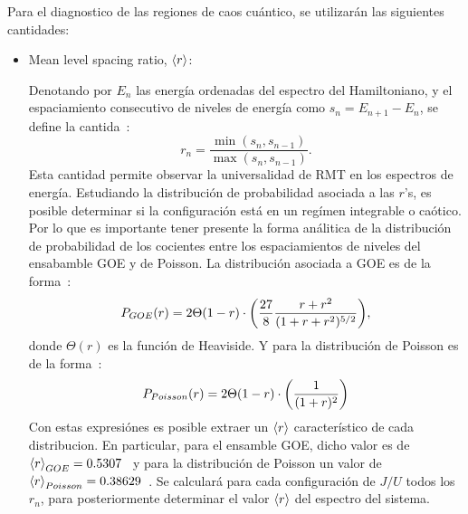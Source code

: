 \documentclass[spanish,titlepage,table]{practicas}
\begin{document}
Para el diagnostico de las regiones de caos cuántico, se utilizarán las siguientes cantidades:
\begin{itemize}
    \item Mean level spacing ratio, $\ev{r}$:

Denotando por $E_n$ las energía ordenadas del espectro del Hamiltoniano, y el espaciamiento consecutivo de niveles de energía como 
$s_n=E_{n+1}-E_{n}$, se define la cantida~\cite{Atas_2013}:
\begin{equation}
	r_n=\frac{\min(s_n,s_{n-1})}{\max(s_n,s_{n-1})}.
\end{equation}
Esta cantidad permite observar la universalidad de RMT en los espectros de energía.
Estudiando la distribución de probabilidad asociada a las $r$'s, es posible determinar si la configuración está en un regímen integrable 
o caótico. Por lo que es importante tener presente la forma análitica de la distribución de probabilidad de los cocientes entre 
los espaciamientos de niveles del ensabamble GOE y de Poisson.
La distribución asociada a GOE es de la forma~\cite{Atas_2013}:
\begin{equation}
 P_{GOE}(r)=2\Theta(1-r)\cdot \qty(\frac{27}{8}\frac{r+r^{2}}{(1+r+r^{2})^{5/2}}),
\end{equation}
donde $\Theta(r)$ es la función de Heaviside.
Y para la distribución de Poisson es de la forma~\cite{Tekur2020}:
\begin{equation}
    P_{Poisson}(r)=2\Theta(1-r)\cdot\qty(\frac{1}{(1+r)^{2}})
\end{equation}
Con estas expresiónes es posible extraer un $\ev{r}$ característico de cada distribucion.
En particular, para el ensamble GOE, dicho valor es de $\ev{r}_{GOE}=0.5307$~\cite{Atas_2013} 
y para la distribución de Poisson  un valor de $\ev{r}_{Poisson}=0.38629$~\cite{Atas_2013}. 
Se calculará para cada configuración de $J/U$ todos los $r_n$, para posteriormente determinar el valor $\ev{r}$ del espectro del sistema.

\end{itemize}
\end{document}
